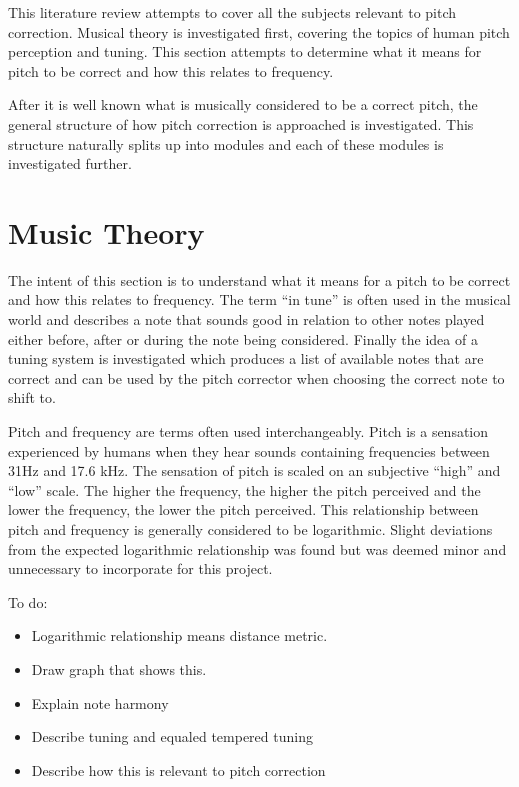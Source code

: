
This literature review attempts to cover all the subjects relevant to pitch
correction. Musical theory is investigated first, covering the topics of human
pitch perception and tuning. This section attempts to determine what it means for
pitch to be correct and how this relates to frequency.

After it is well known what is musically considered to be a correct pitch, the
general structure of how pitch correction is approached is investigated. This
structure naturally splits up into modules and each of these modules is
investigated further.

\section{Music Theory}

The intent of this section is to understand what it means for a pitch to be
correct and how this relates to frequency. The term ``in tune'' is often used in
the musical world and describes a note that sounds good in relation to other notes
played either before, after or during the note being considered. Finally the idea
of a tuning system is investigated which produces a list of available notes that
are correct and can be used by the pitch corrector when choosing the correct note
to shift to.

Pitch and frequency are terms often used interchangeably. Pitch is a sensation
experienced by humans when they hear sounds containing frequencies between 31Hz
and 17.6 kHz\cite{Hearing}. The sensation of pitch is scaled on an subjective
``high'' and ``low'' scale. The higher the frequency, the higher the pitch
perceived and the lower the frequency, the lower the pitch perceived. This
relationship between pitch and frequency is generally considered to be
logarithmic.  Slight deviations from the expected logarithmic relationship was
found \cite{PitchVsFrequency} but was deemed minor and unnecessary to incorporate
for this project.

\color{red}
To do:
\begin{itemize}
	\item Logarithmic relationship means distance metric.
	\item Draw graph that shows this.
	\item Explain note harmony
	\item Describe tuning and equaled tempered tuning
	\item Describe how this is relevant to pitch correction
\end{itemize}
\color{black}

